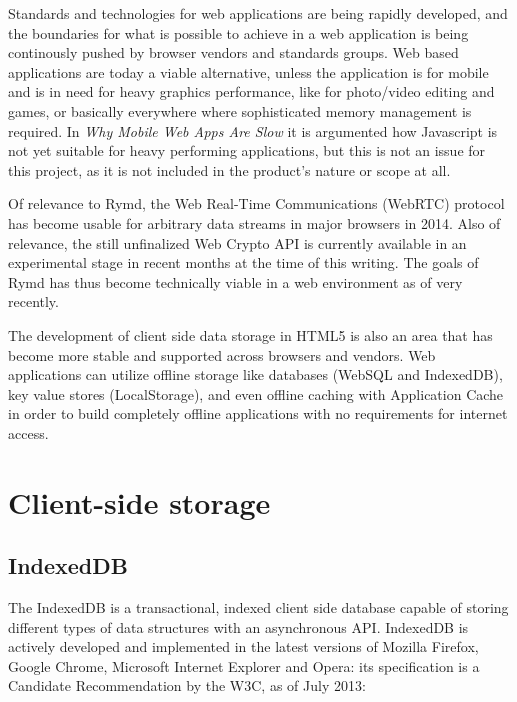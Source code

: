 Standards and technologies for web applications are being rapidly developed, and the boundaries for what is possible to achieve in a web application is being continously pushed by browser vendors and standards groups. Web based applications are today a viable alternative, unless the application is for mobile and is in need for heavy graphics performance, like for photo/video editing and games, or basically everywhere where sophisticated memory management is required. In \emph{Why Mobile Web Apps Are Slow} \cite{MobileApps:Online} it is argumented how Javascript is not yet suitable for heavy performing applications, but this is not an issue for this project, as it is not included in the product's nature or scope at all.

Of relevance to Rymd, the Web Real-Time Communications (WebRTC) protocol \cite{WebRTC:Online} has become usable for arbitrary data streams in major browsers in 2014. Also of relevance, the still unfinalized Web Crypto API \cite{WebCrypto:Online} is currently available in an experimental stage in recent months at the time of this writing. The goals of Rymd has thus become technically viable in a web environment as of very recently.

The development of client side data storage in HTML5 is also an area that has become more stable and supported across browsers and vendors. Web applications can utilize offline storage like databases (WebSQL and IndexedDB), key value stores (LocalStorage), and even offline caching with Application Cache \cite{OfflineWebApps:Online} in order to build completely offline applications with no requirements for internet access.


\section{Client-side storage}


\subsection{IndexedDB}
\label{sec:indexeddb}
The IndexedDB is a transactional, indexed client side database capable of storing different types of data structures with an asynchronous API. IndexedDB is actively developed and implemented in the latest versions of Mozilla Firefox, Google Chrome, Microsoft Internet Explorer and Opera: its specification is a Candidate Recommendation by the W3C, as of July 2013\cite{IndexedDB:Online}:

